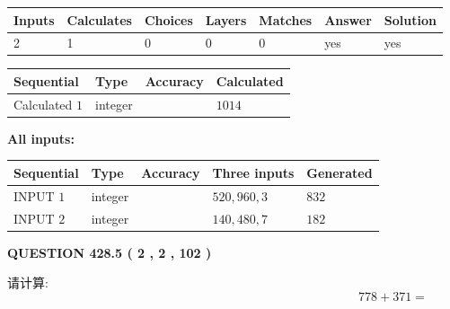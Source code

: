 \documentclass{ctexart}
\begin{document}
 

 
   
   
   
   
\noindent\begin{tabular}{|l|l|l|l|l|l|l|}
 \hline
Inputs & Calculates & Choices & Layers & Matches & Answer & Solution \\ \hline
 2  & 
 1  & 
 0
  & 
 0  & 
 0  & 
  yes & 
  yes 
  \\ \hline
 \end{tabular}
   
   
   
   
\noindent{}
   
   
  
  
\noindent\begin{tabular}{|l|l|l|l|}
\hline
 Sequential & Type & Accuracy & Calculated \\ 
\hline
 
 
  Calculated $  1 $ & integer &  & 
  $ 1014 $ 
 \\  \hline  
 \end{tabular}
   
   
   
   
\noindent\vspace{0.1in}\hspace{-0.08in} {\textbf{\Large{All inputs: }}}
   
   
  
  
\noindent\begin{tabular}{|l|l|l|l|l|}
\hline
 Sequential & Type & Accuracy & Three inputs & Generated \\ 
\hline
 
 
  INPUT $  1 $ & integer &  & $
 520
 , 
 960
 , 
 3
 $ & $ 832 $ 
 \\  \hline  
 
 
  INPUT $  2 $ & integer &  & $
 140
 , 
 480
 , 
 7
 $ & $ 182 $ 
 \\  \hline  
 \end{tabular}
   
   
  
\vspace{0.2in}
  
{\textbf{\Large{QUESTION
428.5 
 ( 2 , 2 , 102 )
}}}
  
  
 
请计算:
\begin{equation}
778 +  %
371 = \nonumber
\end{equation}
 
\end{document}
